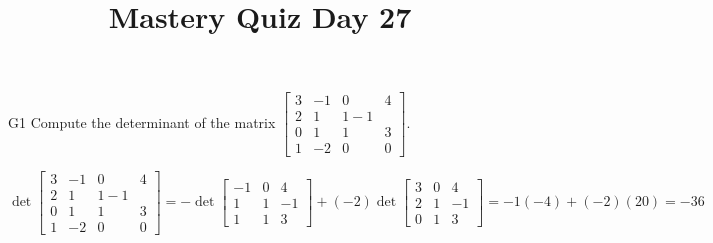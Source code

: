 \documentclass{sbgLAquiz}
\title{Mastery Quiz Day 27 }
\begin{document}
\begin{problem}{G1}
Compute the determinant of the matrix $\begin{bmatrix} 3 & -1 & 0 & 4 \\ 2 & 1 & 1 -1 \\ 0 & 1 & 1 & 3 \\ 1 & -2 & 0 & 0 \end{bmatrix}$.
\end{problem}
\begin{solution}
$$\det \begin{bmatrix} 3 & -1 & 0 & 4 \\ 2 & 1 & 1 -1 \\ 0 & 1 & 1 & 3 \\ 1 & -2 & 0 & 0 \end{bmatrix} = -\det \begin{bmatrix} -1 & 0 & 4 \\ 1 & 1 & -1 \\ 1 & 1 & 3 \end{bmatrix} +(-2) \det \begin{bmatrix} 3 & 0 & 4 \\ 2 & 1 & -1 \\ 0 & 1 & 3 \end{bmatrix} = -1(-4)+(-2)(20) = -36$$
\end{solution}
\end{document}
